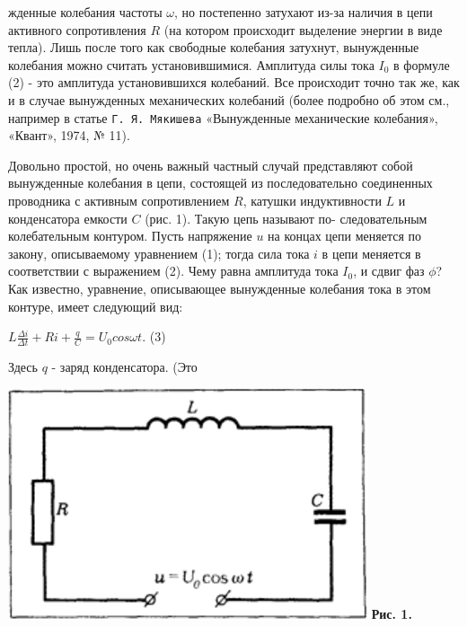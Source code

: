 \begin{multicols}{2}
\columnbreak

\noindent
 жденные колебания частоты $\omega$, но постепенно затухают из-за наличия в цепи активного сопротивления $R$ (на котором происходит выделение энергии в виде тепла). Лишь после того как свободные колебания затухнут, вынужденные колебания можно считать установившимися. Амплитуда силы тока $I_0$ в формуле (2) - это амплитуда установившихся колебаний. Все происходит точно так же, как и в случае вынужденных механических колебаний (более подробно об этом см., например в статье \texttt{Г. Я. Мякишева} «Вынужденные механические колебания», «Квант», 1974, № 11).

\indent Довольно простой, но очень важный частный случай представляют собой вынужденные колебания в цепи, состоящей из последовательно соединенных проводника с активным сопротивлением $R$, катушки индуктивности $L$ и конденсатора емкости $C$ (рис. 1). Такую цепь называют по- следовательным колебательным контуром. Пусть напряжение $u$ на концах цепи меняется по закону, описываемому уравнением (1); тогда сила тока $i$ в цепи меняется в соответствии с выражением (2). Чему равна амплитуда тока $I_0$, и сдвиг фаз $\phi$?
Как известно, уравнение, описывающее вынужденные колебания тока в этом контуре, имеет следующий вид:
\begin{center}
    $L\frac{\Delta i}{\Delta t} + Ri + \frac{q}{C} = U_0cos\omega t$. (3)
\end{center}
Здесь $q$ - заряд конденсатора. (Это

\begin{flushleft}
    \includegraphics[width=\linewidth]{img.png}
    \small \bfseries Рис. 1.
\end{flushleft}

\end{multicols}

